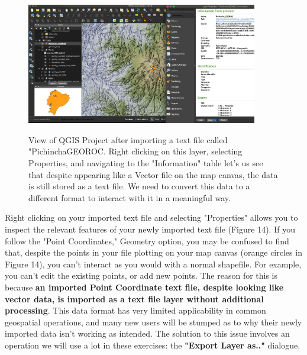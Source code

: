 \documentclass{article}
\begin{document}
\begin{figure}[htbp]
    \centering
    \includegraphics[width=0.9\textwidth]{Fig_14_imported_csv.png}
    \label{fig13}
    \caption{View of QGIS Project after importing a text file called "Pichincha\-GEOROC. Right clicking on this layer, selecting Properties, and navigating to the "Information" table let's us see that despite appearing like a Vector file on the map canvas, the data is still stored as a text file. We need to convert this data to a different format to interact with it in a meaningful way.}
\end{figure}

Right clicking on your imported text file and selecting "Properties" allows you to inspect the relevant features of your newly imported text file (Figure 14). If you follow the "Point Coordinates," Geometry option, you may be confused to find that, despite the points in your file plotting on your map canvas (orange circles in Figure 14), you can't interact as you would with a normal shapefile. For example, you can't edit the existing points, or add new points. The reason for this is because \textbf{an imported Point Coordinate text file, despite looking like vector data, is imported as a text file layer without additional processing}. This data format has very limited applicability in common geospatial operations, and many new users will be stumped as to why their newly imported data isn't working as intended. The solution to this issue involves an operation we will use a lot in these exercises: the \textbf{"Export Layer as.."} dialogue. 
\end{document}
